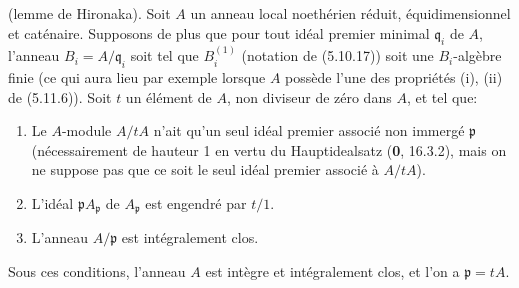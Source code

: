 \begin{proposition}[5.12.8]
\label{IV.2.s5.12.8-fr}
(lemme de Hironaka). Soit $A$ un anneau local noethérien réduit,
équidimensionnel et caténaire. Supposons de plus que pour tout idéal premier
minimal $\mathfrak q_i$ de $A$, l'anneau $B_i=A/\mathfrak q_i$ soit tel que
$B_i^{(1)}$ \textup{(notation de (5.10.17))} soit une $B_i$-algèbre finie \textup{(ce qui aura
lieu par exemple lorsque $A$ possède l'une des propriétés (i), (ii) de
(5.11.6))}. Soit $t$ un élément de $A$, non diviseur de zéro dans $A$, et tel
que:
\begin{enumerate}
\item[\textup{(i)}] Le $A$-module $A/tA$ n'ait qu'un seul idéal premier associé non
immergé $\mathfrak p$ \textup{(nécessairement de hauteur 1 en vertu du
Hauptidealsatz (\textbf{0}, 16.3.2), mais on ne suppose pas que ce soit le seul idéal
premier associé à $A/tA$)}.
\item[\textup{(ii)}] L'idéal $\mathfrak pA_{\mathfrak p}$ de $A_{\mathfrak p}$ est
engendré par $t/1$.
\item[\textup{(iii)}] L'anneau $A/\mathfrak p$ est intégralement clos.
\end{enumerate}
Sous ces conditions, l'anneau $A$ est intègre et intégralement clos, et l'on a
$\mathfrak p=tA$.
\end{proposition}

